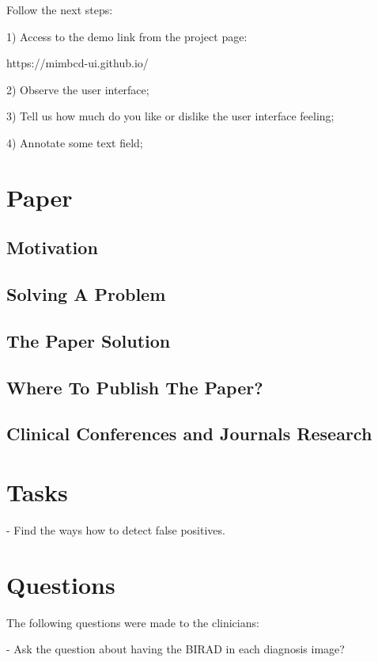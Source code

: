 Follow the next steps:

1) Access to the demo link from the project page:

https://mimbcd-ui.github.io/

2) Observe the user interface;

3) Tell us how much do you like or dislike the user interface feeling;

4) Annotate some text field;

\section{Paper}

\subsection{Motivation}

\subsection{Solving A Problem}

\subsection{The Paper Solution}

\subsection{Where To Publish The Paper?}

\subsection{Clinical Conferences and Journals Research}

\section{Tasks}

- Find the ways how to detect false positives.

\section{Questions}

The following questions were made to the clinicians:

- Ask the question about having the BIRAD in each diagnosis image?

